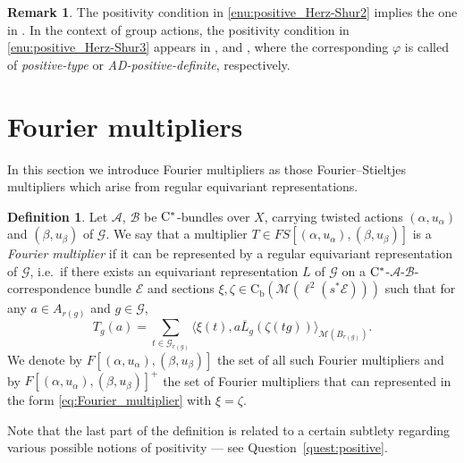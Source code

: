 \documentclass[11 pt, leqno]{amsart}
\numberwithin{equation}{section}
\theoremstyle{plain}
\theoremstyle{definition}
\newtheorem {defn}[thm] {Definition}
\newtheorem {rem} [thm]{Remark}
\newcommand*{\contb}{\mathrm{C_b}}%
\newcommand{\B}{\mathcal B}
\newcommand{\M}{\mathcal M}
\newcommand{\G}{\mathcal G} %
\newcommand{\EE}{\mathcal E}
\newcommand{\A}{\mathcal A}
\newcommand{\cst}{\ifmmode\mathrm{C}^*\else{$\mathrm{C}^*$}\fi}
\begin{document}
\begin{rem}\label{rem:positive_type_conditions} 
The positivity condition in \ref{enu:positive_Herz-Shur2} implies the one in \cite[Definition 3.4]{BartoszKangAdam}. 
In the context of group actions, the positivity condition in \ref{enu:positive_Herz-Shur3} appears in \cite{Clare1}, \cite{Clare2} and \cite{BedosConti2}, where the corresponding $\varphi$ is called of \emph{positive-type} or \emph{AD-positive-definite}, respectively.	
\end{rem}



%
%
\section{Fourier multipliers} %
\label{Sec:Fourierapproximation}

In this section we introduce Fourier multipliers as those Fourier--Stieltjes multipliers which arise from regular equivariant representations.

\begin{defn}\label{de:FourierAlgebra}
Let $\A$, $\B$ be $\cst$-bundles over $X$, carrying twisted actions $(\alpha,u_\alpha)$ and $(\beta,u_\beta)$ of $\G$. 
We say that a multiplier $T\in FS[(\alpha,u_{\alpha}),(\beta,u_{\beta})]$ is a \emph{Fourier multiplier} if it can be represented by a regular equivariant representation of $\G$, i.e.\ if there exists an equivariant representation $ L$ of $\G$ on a $\cst$-$\A$-$\B$-correspondence bundle $\EE$ and sections $\xi,\zeta\in \contb(\M(\ell^2(s^*\EE)))$ such that for any $a\in A_{r(g)}$ and $g\in \G$, 
\begin{equation}\label{eq:Fourier_multiplier}
    T_g(a) = \sum_{t\in \G_{r(g)}} \langle \xi(t), a \overline{L}_{g}(\zeta(tg))\rangle_{\M(B_{r(g)})}.
\end{equation}
We denote by $F[(\alpha,u_{\alpha}),(\beta,u_{\beta})]$ the set of all such Fourier multipliers and by $F[(\alpha,u_{\alpha}),(\beta,u_{\beta})]^+$ the set of Fourier multipliers that can represented in the form \eqref{eq:Fourier_multiplier} with $\xi=\zeta$. 
\end{defn}

Note that the last part of the definition is related to a certain subtlety regarding various possible notions of positivity --- see Question~\ref{quest:positive}.
\end{document}
